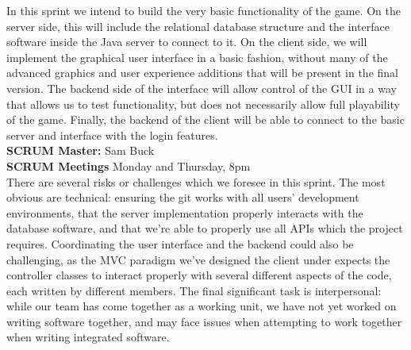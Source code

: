 In this sprint we intend to build the very basic functionality of the game. On the server side, this will include the relational database structure and the interface software inside the Java server to connect to it. On the client side, we will implement the graphical user interface in a basic fashion, without many of the advanced graphics and user experience additions that will be present in the final version. The backend side of the interface will allow control of the GUI in a way that allows us to test functionality, but does not necessarily allow full playability of the game. Finally, the backend of the client will be able to connect to the basic server and interface with the login features.\\

\textbf{SCRUM Master:} Sam Buck\\


\textbf{SCRUM Meetings} Monday and Thursday, 8pm\\

\noindent There are several risks or challenges which we foresee in this sprint. The most obvious are technical: ensuring the git works with all users' development environments, that the server implementation properly interacts with the database software, and that we're able to properly use all APIs which the project requires. Coordinating the user interface and the backend could also be challenging, as the MVC paradigm we've designed the client under expects the controller classes to interact properly with several different aspects of the code, each written by different members. The final significant task is interpersonal: while our team has come together as a working unit, we have not yet worked on writing software together, and may face issues when attempting to work together when writing integrated software.